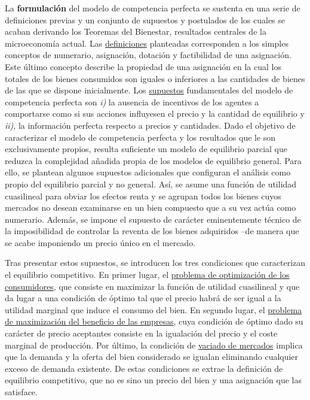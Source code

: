 \documentclass{nuevotema}
\begin{document}
La \textbf{formulación} del modelo de competencia perfecta se sustenta en una serie de definiciones previas y un conjunto de supuestos y postulados de los cuales se acaban derivando los Teoremas del Bienestar, resultados centrales de la microeconomía actual. Las \underline{definiciones} planteadas corresponden a los simples conceptos de numerario, asignación, dotación y factibilidad de una asignación. Este último concepto describe la propiedad de una asignación en la cual los totales de los bienes consumidos son iguales o inferiores a las cantidades de bienes de las que se dispone inicialmente. Los \underline{supuestos} fundamentales del modelo de competencia perfecta son \textit{i)} la ausencia de incentivos de los agentes a comportarse como si sus acciones influyesen el precio y la cantidad de equilibrio y \textit{ii)}, la información perfecta respecto a precios y cantidades. Dado el objetivo de caracterizar el modelo de competencia perfecta y los resultados que le son exclusivamente propios, resulta suficiente un modelo de equilibrio parcial que reduzca la complejidad añadida propia de los modelos de equilibrio general. Para ello, se plantean algunos supuestos adicionales que configuran el análisis como propio del equilibrio parcial y no general. Así, se asume una función de utilidad cuasilineal para obviar los efectos renta y se agrupan todos los bienes cuyos mercados no desean examinarse en un bien compuesto que a su vez actúa como numerario. Además, se impone el supuesto de carácter eminentemente técnico de la imposibilidad de controlar la reventa de los bienes adquiridos --de manera que se acabe imponiendo un precio único en el mercado.

Tras presentar estos supuestos, se introducen los tres condiciones que caracterizan el equilibrio competitivo. En primer lugar, el \underline{problema de optimización de los consumidores}, que consiste en maximizar la función de utilidad cuasilineal y que da lugar a una condición de óptimo tal que el precio habrá de ser igual a la utilidad marginal que induce el consumo del bien. En segundo lugar, el \underline{problema de maximización del beneficio de las empresas}, cuya condición de óptimo dado su carácter de precio aceptantes consiste en la igualación del precio y el coste marginal de producción. Por último, la condición de \underline{vaciado de mercados} implica que la demanda y la oferta del bien considerado se igualan eliminando cualquier exceso de demanda existente. De estas condiciones se extrae la definición de equilibrio competitivo, que no es sino un precio del bien y una asignación que las satisface. 
\end{document}
